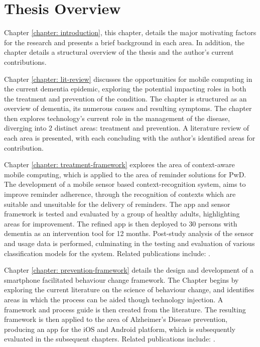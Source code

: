 \section{Thesis Overview}
Chapter \ref{chapter: introduction}, this chapter,  details the major motivating factors for the research and presents a brief background in each area. In addition, the chapter details a structural overview of the thesis and the author's current contributions. 

Chapter \ref{chapter: lit-review} discusses the opportunities for mobile computing in the current dementia epidemic, exploring the potential impacting roles in both the treatment and prevention of the condition. The chapter is structured as an overview of dementia, its numerous causes and resulting symptoms. The chapter then explores technology's current role in the management of the disease, diverging into 2 distinct areas: treatment and prevention. A literature review of each area is presented, with each concluding with the author's identified areas for contribution.

Chapter \ref{chapter: treatment-framework} explores the area of context-aware mobile computing, which is applied to the area of reminder solutions for PwD. The development of a mobile sensor based context-recognition system, aims to improve reminder adherence, through the recognition of contexts which are suitable and unsuitable for the delivery of reminders. The app and sensor framework is tested and evaluated by a group of healthy adults, highlighting areas for improvement. The refined app is then deployed to 30 persons with dementia as an intervention tool for 12 months. Post-study analysis of the sensor and usage data is performed, culminating in the testing and evaluation of various classification models for the system. 
Related publications include: \cite{Hartin2014-EMBC, Hartin2014-WAGER, Patterson2015, Cleland2014-IWAAL, Cleland2015-mHealth, Nugent2014-aaic, Behrens2015}.

Chapter \ref{chapter: prevention-framework} details the design and development of a smartphone facilitated behaviour change framework. The Chapter begins by exploring the current literature on the science of behaviour change, and identifies areas in which the process can be aided though technology injection. A framework and process guide is then created from the literature. The resulting framework is then applied to the area of Alzheimer's Disease prevention, producing an app for the iOS and Android platform, which is subsequently evaluated in the subsequent chapters. 
Related publications include: \cite{Hartin2015-JMIR, Hartin2014-IWAAL, Hartin2015-ICOST, Hartin2014-AAIC, Hartin2015-AAIC, Hartin2015-mHealth, Norton2015-TRCI, Norton2015-AAIC, Weyerman2015}.

